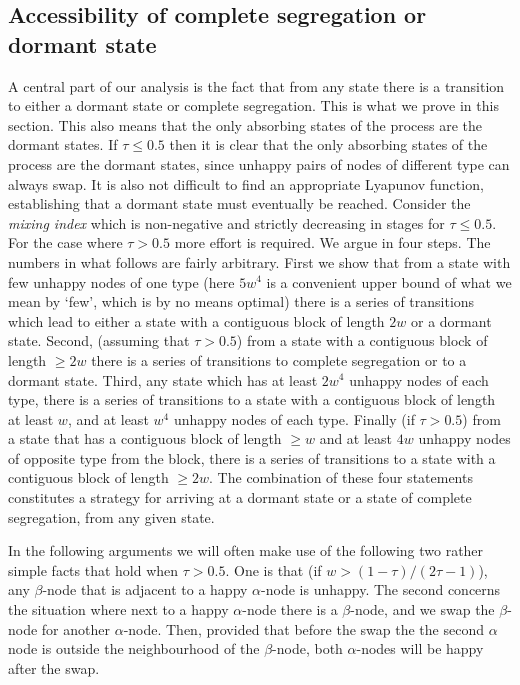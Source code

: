 \documentclass[11pt]{article}
\theoremstyle{plain}
\numberwithin{equation}{subsection}
\begin{document}
\subsection{Accessibility of complete segregation or dormant state}\label{se:accesscomplseg}
A central part of our analysis is the fact that from any state there is a transition to either a dormant state or
complete segregation. This is what we prove in this section.
This also means that the only absorbing states of the process are the dormant states.
If $\tau\leq 0.5$ then it is clear that the only absorbing states of the process are the dormant states, since unhappy pairs of nodes of different type can always swap. It is also not difficult to find an appropriate Lyapunov function, establishing that a dormant state must eventually be reached. Consider the  \emph{mixing index} which is non-negative and strictly decreasing in stages for $\tau\leq 0.5$. 
For the case where $\tau>0.5$ more effort is required. We argue in four steps. 
The numbers in what follows are fairly arbitrary. First we show that
from a state with few unhappy nodes of one type (here $5w^4$ is a convenient upper bound of
what we mean by `few', which is by no means optimal) there is a series of transitions which lead to either
a state with a contiguous block of length $2w$ or a dormant state.
Second, 
(assuming that $\tau>0.5$) from a state with a contiguous block of length $\geq 2w$
there is a series of transitions to complete segregation or to a dormant state.
Third,
any state which has at least $2w^4$ unhappy nodes of each type,
there is a series of transitions to a state with a contiguous 
block of length at least $w$,  and at least $w^4$ unhappy nodes of each type.
Finally 
(if $\tau> 0.5$) from a state that has a contiguous block  of length $\geq w$
and at least $4w$ unhappy nodes of opposite type from the block,  there is a series of
transitions to a state with a contiguous block  of length $\geq 2w$.
The combination of these four statements constitutes a strategy for arriving at a dormant state or
a state of complete segregation, from any given state.


In the following arguments we will often make use of the following two rather simple facts
that hold when  $\tau>0.5$.
One is that (if $w>(1-\tau)/(2\tau-1)$), 
any $\beta$-node that is adjacent to a happy $\alpha$-node is unhappy. 
The second concerns the situation where
next to a happy $\alpha$-node there is a $\beta$-node, and we swap
the $\beta$-node for another $\alpha$-node. Then, provided that before the swap the 
the second $\alpha$ node is outside the neighbourhood of
the $\beta$-node, both $\alpha$-nodes will be happy after the swap.
\end{document}
